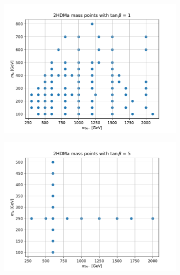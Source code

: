 \documentclass[12pt, a4paper]{book}
\begin{document}
\begin{figure}[!ht]
    \centering
    \begin{subfigure}[b]{0.45\textwidth}
        \includegraphics[width=\textwidth]{2HDM_tb1.pdf}    
    \end{subfigure}
    \begin{subfigure}[b]{0.45\textwidth}
        \includegraphics[width=\textwidth]{2HDM_tb5.pdf}    
    \end{subfigure}
    \begin{subfigure}[b]{0.45\textwidth}

\end{subfigure}
\end{figure}
\end{document}
